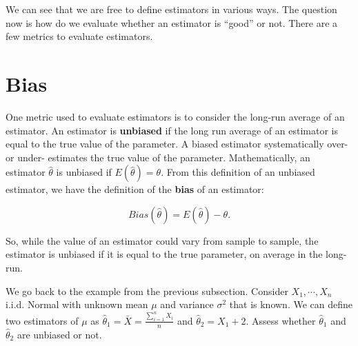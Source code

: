 \documentclass[
]{book}
\theoremstyle{definition}
\theoremstyle{definition}
\theoremstyle{definition}
\theoremstyle{definition}
\theoremstyle{remark}
\begin{document}
We can see that we are free to define estimators in various ways. The question now is how do we evaluate whether an estimator is ``good'' or not. There are a few metrics to evaluate estimators.

\hypertarget{biasest}{%
\section{Bias}\label{biasest}}

One metric used to evaluate estimators is to consider the long-run average of an estimator. An estimator is \textbf{unbiased} if the long run average of an estimator is equal to the true value of the parameter. A biased estimator systematically over- or under- estimates the true value of the parameter. Mathematically, an estimator \(\hat{\theta}\) is unbiased if \(E(\hat{\theta}) = \theta\). From this definition of an unbiased estimator, we have the definition of the \textbf{bias} of an estimator:

\begin{equation} 
Bias(\hat{\theta}) = E(\hat{\theta}) - \theta.
\label{eq:7-bias}
\end{equation}

So, while the value of an estimator could vary from sample to sample, the estimator is unbiased if it is equal to the true parameter, on average in the long-run.

We go back to the example from the previous subsection. Consider \(X_1, \cdots, X_n\) i.i.d. Normal with unknown mean \(\mu\) and variance \(\sigma^2\) that is known. We can define two estimators of \(\mu\) as \(\hat{\theta}_1 = \bar{X} = \frac{\sum_{i=1}^n X_i}{n}\) and \(\hat{\theta}_2 = X_1 + 2\). Assess whether \(\hat{\theta}_1\) and \(\hat{\theta}_2\) are unbiased or not.
\end{document}
